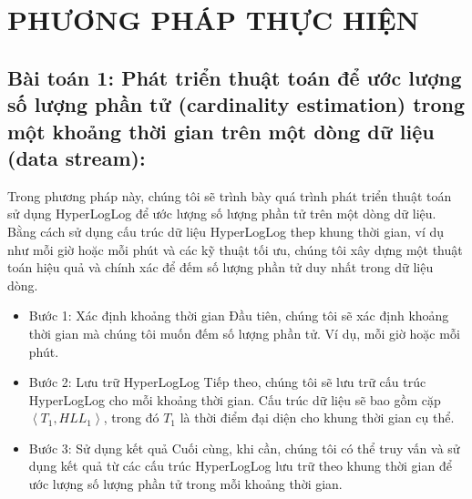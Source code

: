 \documentclass[letterpaper,13pt]{article}
\theoremstyle{mytheor}
\begin{document}
\section{PHƯƠNG PHÁP THỰC HIỆN}
\subsection{\textbf{Bài toán 1:} Phát triển thuật toán để ước lượng số lượng phần tử (cardinality estimation) trong một khoảng thời gian trên một dòng dữ liệu (data stream):}
Trong phương pháp này, chúng tôi sẽ trình bày quá trình phát triển thuật toán sử dụng HyperLogLog để ước lượng 
số lượng phần tử trên một dòng dữ liệu. Bằng cách sử dụng cấu trúc dữ liệu HyperLogLog thep khung thời gian, ví dụ như mỗi giờ hoặc mỗi phút và các kỹ thuật tối ưu, 
chúng tôi xây dựng một thuật toán hiệu quả và chính xác để đếm số lượng phần tử duy nhất trong dữ liệu dòng.
\begin{itemize}
    \item Bước 1: Xác định khoảng thời gian
    Đầu tiên, chúng tôi sẽ xác định khoảng thời gian mà chúng tôi muốn đếm số lượng phần tử. Ví dụ, mỗi giờ hoặc mỗi phút.
    \item Bước 2: Lưu trữ HyperLogLog
    Tiếp theo, chúng tôi sẽ lưu trữ cấu trúc HyperLogLog cho mỗi khoảng thời gian. Cấu trúc dữ liệu sẽ bao gồm cặp $\left< T_1, HLL_1\right>$, 
    trong đó $T_1$ là thời điểm đại diện cho khung thời gian cụ thể.
    \item Bước 3: Sử dụng kết quả
    Cuối cùng, khi cần, chúng tôi có thể truy vấn và sử dụng kết quả từ các cấu trúc HyperLogLog lưu trữ theo khung thời gian để 
    ước lượng số lượng phần tử trong mỗi khoảng thời gian.
\end{itemize}
\end{document}
